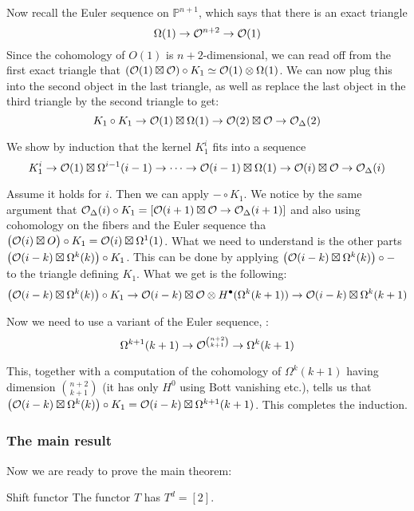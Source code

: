 Now recall the Euler sequence on $\mathbb{P}^{n+1}$, which says that there is an exact triangle $$\Omega(1)\rightarrow \mathcal{O}^{n+2}\rightarrow \mathcal{O}(1)$$
Since the cohomology of $O(1)$ is $n+2$-dimensional, we can read off from the first exact triangle that $ (\mathcal{O}(1)\boxtimes \mathcal{O}) \circ K_1\simeq \mathcal{O}(1) \otimes \Omega(1)$. We can now plug this into the second object in the last triangle, as well as replace the last object in the third triangle by the second triangle to get: $$K_1 \circ K_1 \rightarrow \mathcal{O}(1)\boxtimes \Omega(1)\rightarrow \mathcal{O}(2)\boxtimes \mathcal{O} \rightarrow \mathcal{O}_\Delta(2)$$

We show by induction that the kernel $K_1^i$ fits into a sequence $$K_1^i\rightarrow \mathcal{O}(1)\boxtimes \Omega^{i-1}(i-1)\rightarrow \dots \rightarrow \mathcal{O}(i-1)\boxtimes \Omega(1)\rightarrow \mathcal{O}(i)\boxtimes \mathcal{O} \rightarrow \mathcal{O}_\Delta(i)$$

Assume it holds for $i$. Then we can apply $-\circ K_1$. We notice by the same argument that $\mathcal{O}_\Delta(i)\circ K_1= [\mathcal{O}(i+1)\boxtimes \mathcal{O} \rightarrow \mathcal{O}_\Delta(i+1)]$ and also using cohomology on the fibers and the Euler sequence tha $\big( \mathcal{O}(i)\boxtimes O\big)\circ K_1=\mathcal{O}(i)\boxtimes \Omega^1(1)$. What we need to understand is the other parts $\big(\mathcal{O}(i-k)\boxtimes \Omega^{k}(k)\big) \circ K_1$. This can be done by applying $\big(\mathcal{O}(i-k)\boxtimes \Omega^k(k)\big)\circ -$ to the triangle defining $K_1$. What we get is the following: $$\big(\mathcal{O}(i-k)\boxtimes \Omega^k(k)\big)\circ K_1 \rightarrow \mathcal{O}(i-k)\boxtimes \mathcal{O} \otimes H^\bullet(\Omega^k(k+1))\rightarrow \mathcal{O}(i-k)\boxtimes \Omega^k(k+1)$$

Now we need to use a variant of the Euler sequence, \cite[Corollary 17.1.3]{arapura_algebraic_2012}: $$\Omega^{k+1}(k+1)\rightarrow \mathcal{O}^{\binom{n+2}{k+1}}\rightarrow \Omega^k(k+1)$$

This, together with a computation of the cohomology of $\Omega^k(k+1)$ having dimension $\binom{n+2}{k+1}$ (it has only $H^0$ using Bott vanishing etc.), tells us that $\big(\mathcal{O}(i-k)\boxtimes \Omega^{k}(k)\big) \circ K_1=\mathcal{O}(i-k)\boxtimes \Omega^{k+1}(k+1)$. This completes the induction.

\subsubsection{The main result}
Now we are ready to prove the main theorem:

\begin{theorem}{Shift functor}{}
    The functor $T$ has $T^d=[2]$.
\end{theorem}

